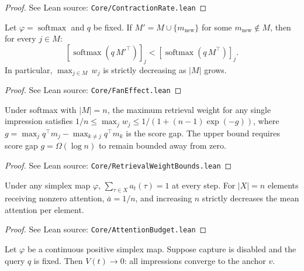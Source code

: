 \begin{proof}
\leanok
{}
See Lean source: \texttt{Core/ContractionRate.lean}
\end{proof}

\begin{corollary}
\label{cor:fan}
\leanok
{}
Let $\varphi = \operatorname{softmax}$ and $q$ be fixed. If $M' = M \cup \{m_{\mathrm{new}}\}$ for some $m_{\mathrm{new}} \notin M$, then for every $j \in M$:
\[
[\operatorname{softmax}(q\,M'^\top)]_j < [\operatorname{softmax}(q\,M^\top)]_j.
\]
In particular, $\max_{j \in M}\,w_j$ is strictly decreasing as $|M|$ grows.
\end{corollary}

\begin{proof}
\leanok
{}
See Lean source: \texttt{Core/FanEffect.lean}
\end{proof}

\begin{corollary}
\label{cor:opposition}
\leanok
Under softmax with $|M| = n$, the maximum retrieval weight for any single impression satisfies $1/n \leq \max_j w_j \leq 1/(1 + (n-1)\exp(-g))$, where $g = \max_j q^\top m_j - \max_{k \neq j} q^\top m_k$ is the score gap. The upper bound requires score gap $g = \Omega(\log n)$ to remain bounded away from zero.
\end{corollary}

\begin{proof}
\leanok
See Lean source: \texttt{Core/RetrievalWeightBounds.lean}
\end{proof}

\begin{corollary}
\label{cor:budget}
\leanok
{}
Under any simplex map $\varphi$, $\sum_{\tau \in X} a_t(\tau) = 1$ at every step. For $|X| = n$ elements receiving nonzero attention, $\bar{a} = 1/n$, and increasing $n$ strictly decreases the mean attention per element.
\end{corollary}

\begin{proof}
\leanok
{}
See Lean source: \texttt{Core/AttentionBudget.lean}
\end{proof}

\begin{corollary}
\label{cor:sleep}
\leanok
{}
Let $\varphi$ be a continuous positive simplex map. Suppose capture is disabled and the query $q$ is fixed. Then $V(t) \to 0$: all impressions converge to the anchor $v$.
\end{corollary}

